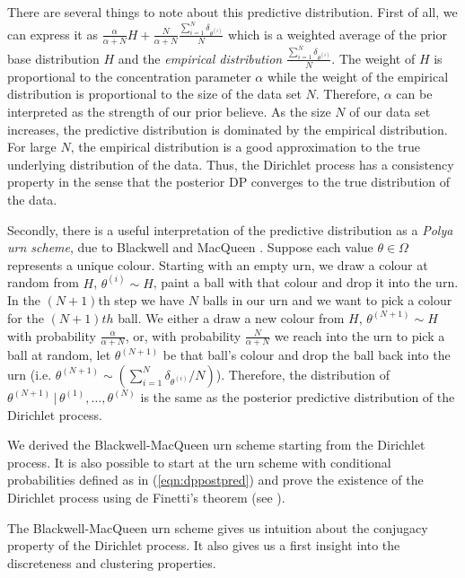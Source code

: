 \documentclass[final,3p,times,twocolumn]{elsarticle}
\begin{document}
There are several things to note about this predictive distribution.
First of all, we can express it as $\frac{\alpha}{\alpha+N}H + \frac{N}{\alpha+N}\frac{\sum_{i=1}^N \delta_{\theta^{(i)}}}{N}$ which is a weighted average of the prior base distribution $H$ and the \emph{empirical distribution} $\frac{\sum_{i=1}^N \delta_{\theta^{(i)}}}{N}$.
The weight of $H$ is proportional to the concentration parameter $\alpha$ while the weight of the empirical distribution is proportional to the size of the data set $N$.
Therefore, $\alpha$ can be interpreted as the strength of our prior believe.
As the size $N$ of our data set increases, the predictive distribution is dominated by the empirical distribution.
For large $N$, the empirical distribution is a good approximation to the true underlying distribution of the data. 
Thus, the Dirichlet process has a consistency property in the sense that the posterior DP converges to the true distribution of the data.

Secondly, there is a useful interpretation of the predictive distribution as a \emph{Polya urn scheme}, due to Blackwell and MacQueen \cite{blackwell1973}.
Suppose each value $\theta \in \Omega$ represents a unique colour.
Starting with an empty urn, we draw a colour at random from $H$, $\theta^{(i)} \sim H$, paint a ball with that colour and drop it into the urn.
In the $(N+1)$th step we have $N$ balls in our urn and we want to pick a colour for the $(N+1)th$ ball.
We either a draw a new colour from $H$, $\theta^{(N+1)} \sim H$ with probability $\frac{\alpha}{\alpha+N}$, or, with probability $\frac{N}{\alpha+N}$ we reach into the urn to pick a ball at random, let $\theta^{(N+1)}$ be that ball's colour and drop the ball back into the urn (i.e. $\theta^{(N+1)}\sim (\sum_{i=1}^N \delta_{\theta^{(i)}}/N)$). 
Therefore, the distribution of $\theta^{(N+1)} \,|\,\theta^{(1)},\dots,\theta^{(N)}$ is the same as the posterior predictive distribution of the Dirichlet process.

We derived the Blackwell-MacQueen urn scheme starting from the Dirichlet process. 
It is also possible to start at the urn scheme with conditional probabilities defined as in (\ref{eqn:dppostpred}) and prove the existence of the Dirichlet process using de Finetti's theorem (see \cite{blackwell1973}).

The Blackwell-MacQueen urn scheme gives us intuition about the conjugacy property of the Dirichlet process.
It also gives us a first insight into the discreteness and clustering properties.
\end{document}
